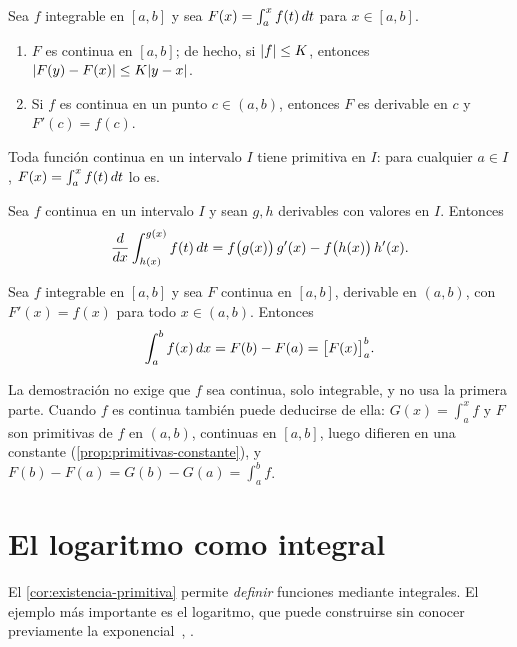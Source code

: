 \begin{teorema}\label{teo:tfc1}
Sea $f$ integrable en $[a,b]$ y sea $F(x)=\int_a^x f(t)\mathop{}\!d t$ para $x\in[a,b]$.
\begin{enumerate}
  \item $F$ es continua en $[a,b]$; de hecho, si $\lvert f\rvert\le K$, entonces $\lvert F(y)-F(x)\rvert\le K\lvert y-x\rvert$.
  \item Si $f$ es continua en un punto $c\in(a,b)$, entonces $F$ es derivable en $c$ y $F'(c)=f(c)$.
\end{enumerate}
\end{teorema}

\begin{corolario}\label{cor:existencia-primitiva}
Toda función continua en un intervalo $I$ tiene primitiva en $I$: para cualquier $a\in I$, $F(x)=\int_a^x f(t)\mathop{}\!d t$ lo es.
\end{corolario}

\begin{corolario}\label{cor:leibniz}
Sea $f$ continua en un intervalo $I$ y sean $g,h$ derivables con valores en $I$. Entonces
\[
\frac{d}{dx}\int_{h(x)}^{g(x)}f(t)\mathop{}\!d t=f\bigl(g(x)\bigr)\,g'(x)-f\bigl(h(x)\bigr)\,h'(x).
\]
\end{corolario}

\begin{teorema}\label{teo:barrow}
Sea $f$ integrable en $[a,b]$ y sea $F$ continua en $[a,b]$, derivable en $(a,b)$, con $F'(x)=f(x)$ para todo $x\in(a,b)$. Entonces
\[
\int_a^b f(x)\mathop{}\!d x=F(b)-F(a)=\bigl[F(x)\bigr]_{a}^{b}.
\]
\end{teorema}

La demostración no exige que $f$ sea continua, solo integrable, y no usa la primera parte. Cuando $f$ es continua también puede deducirse de ella: $G(x)=\int_a^x f$ y $F$ son primitivas de $f$ en $(a,b)$, continuas en $[a,b]$, luego difieren en una constante (\cref{prop:primitivas-constante}), y $F(b)-F(a)=G(b)-G(a)=\int_a^b f$.

\addtocounter{definicion}{1}%

\section{El logaritmo como integral}

El \cref{cor:existencia-primitiva} permite \emph{definir} funciones mediante integrales. El ejemplo más importante es el logaritmo, que puede construirse sin conocer previamente la exponencial~\cite[cap.~18]{spivak}, \cite[cap.~6]{apostol}.

